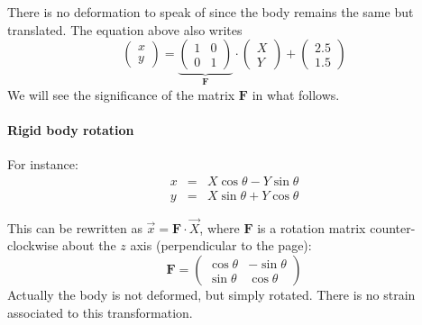 There is no deformation to speak of since the body remains the same but translated. 
The equation above also writes
\[
\left(
\begin{array}{c}
x \\ y
\end{array}
\right)
=
\underbrace{
\left(
\begin{array}{cc}
1 & 0 \\
0 & 1
\end{array}
\right)
}_{\bm F}
\cdot
\left(
\begin{array}{c}
X \\ Y
\end{array}
\right)
+
\left(
\begin{array}{c}
2.5 \\ 1.5
\end{array}
\right)
\]
We will see the significance of the matrix ${\bm F}$ in what follows.

\paragraph{Rigid body rotation} For instance:
\begin{eqnarray}
x &=& X \cos \theta - Y \sin \theta \\ 
y &=& X \sin \theta + Y \cos \theta 
\end{eqnarray}


\begin{center}
\end{center}


This can be rewritten as $\vec{x}={\bm F}\cdot \vec{X}$, where 
${\bm F}$ is a rotation matrix counter-clockwise about the $z$ axis (perpendicular
to the page):
\[
{\bm F} = 
\left(
\begin{array}{cc}
\cos\theta & -\sin\theta \\
\sin\theta & \cos\theta 
\end{array}
\right)
\]
Actually the body is not deformed, but simply rotated. There is no strain associated to this 
transformation. 


